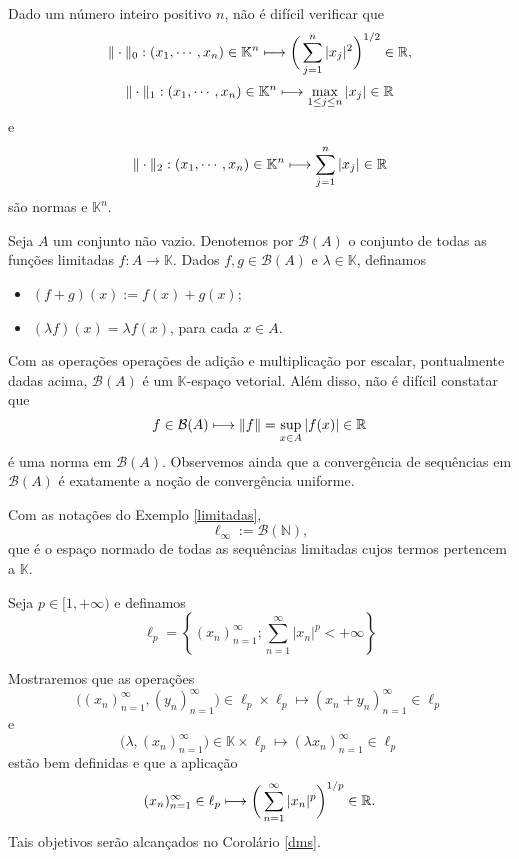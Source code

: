 \begin{example}
    Dado um número inteiro positivo $n$, não é difícil verificar que
    \[
    \displaystyle \|\cdot \|_0 : (x_1,\cdots , x_n) \in \mathbb K^n \longmapsto \bigg( \sum_{j=1}^{n} |x_j|^2\bigg)^{1/2} \in \mathbb{R} ,
    \]
    \[
    \displaystyle \|\cdot \|_1 : (x_1,\cdots , x_n) \in \mathbb K^n \longmapsto \max_{1\leq j \leq n} |x_j| \in \mathbb{R} 
    \]
    e
    \[
    \displaystyle \|\cdot \|_2 : (x_1,\cdots , x_n) \in \mathbb K^n \longmapsto \sum_{j=1}^{n} |x_j| \in \mathbb{R} 
    \]
    são normas e $\mathbb K ^n$.
\end{example}

\begin{example}\label{limitadas}
Seja $A$ um conjunto não vazio. Denotemos por $\mathcal B (A)$ o conjunto de todas as funções limitadas $f: A\longrightarrow \mathbb K$. Dados $f,g \in \mathcal B (A)$ e $\lambda \in \mathbb K$, definamos
\begin{itemize}
\item $(f+g)(x):=f(x)+g(x)$; 
\item $(\lambda f)(x) = \lambda f(x)$,
para cada $x\in A$.
\end{itemize}
Com as operações operações de adição e multiplicação por escalar, pontualmente dadas acima, $\mathcal B (A)$ é um $\mathbb K$-espaço vetorial. Além disso, não é difícil constatar que
\[
\displaystyle f\in \mathcal B (A) \longmapsto \| f\| = \sup_{x\in A} |f(x)| \in \mathbb{R}
\]
é uma norma em $\mathcal B (A)$. Observemos ainda que a convergência de sequências em $\mathcal B (A)$ é exatamente a noção de convergência uniforme. 
\end{example}

\begin{definition}
    Com as notações do Exemplo \ref{limitadas},
    \[
    \ell_{\infty} := \mathcal B (\mathbb N),
    \]
    que é o espaço normado de todas as sequências limitadas cujos termos pertencem a $\mathbb K$.
\end{definition}

\begin{example}\label{lp}
    Seja $p\in [1,+\infty )$ e definamos 
    \[
    \displaystyle \ell_p =\left\{ (x_n )_{n=1}^{\infty}; \sum_{n=1}^{\infty} |x_n|^p <+\infty \right\}
    \]
    
    Mostraremos que as operações 
    \[
    \bigg( (x_n )_{n=1}^{\infty},(y_n )_{n=1}^{\infty} \bigg) \in \ell_p \times \ell_p \longmapsto (x_n +y_n )_{n=1}^{\infty} \in \ell_p
    \]
    e
    \[
    \bigg( \lambda ,(x_n )_{n=1}^{\infty} \bigg) \in \mathbb K \times \ell_p \longmapsto (\lambda x_n )_{n=1}^{\infty} \in \ell_p
    \]
    estão bem definidas e que a aplicação 
    \[
    \displaystyle (x_n )_{n=1}^{\infty} \in \ell_p \longmapsto \bigg( \sum_{n=1}^{\infty} |x_n|^p \bigg)^{1/p} \in \mathbb{R} .
    \]
    Tais objetivos serão alcançados no Corolário \ref{dms}.
\end{example}

